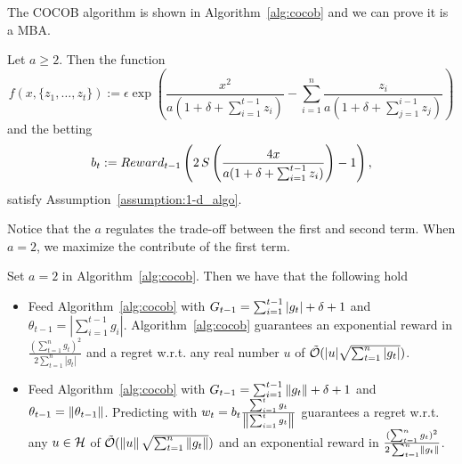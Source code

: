 The \ac{COCOB} algorithm is shown in Algorithm~\ref{alg:cocob} and we can prove it is a \ac{MBA}.
%
\begin{theorem}
\label{theo:cocob}
Let $a\geq2$. Then the function 
\[
f(x,\{z_1, \ldots, z_t\}) := \epsilon \exp\left(\frac{x^2}{a (1+\delta+\sum_{i=1}^{t-1} z_i)} - \sum_{i=1}^{n} \frac{z_i}{a( 1+\delta+\sum_{j=1}^{i-1} z_j) } \right)
\]
and the betting 
\[
b_t:= Reward_{t-1} \left(2 \, S\left(\frac{4 x}{a (1+\delta+\sum_{i=1}^{t-1} z_i)}\right)-1\right),
\]
satisfy Assumption~\ref{assumption:1-d_algo}.
% 
\end{theorem}
%
Notice that the $a$ regulates the trade-off between the first and second term. When $a=2$, we maximize the contribute of the first term.

\begin{cor}
Set $a=2$ in Algorithm~\ref{alg:cocob}. Then we have that the following hold

\begin{itemize}
\item Feed Algorithm~\ref{alg:cocob} with $G_{t-1}=\sum_{i=1}^{t-1} |g_t| + \delta + 1$ and $\theta_{t-1}=|\sum_{i=1}^{t-1} g_i|$.
Algorithm~\ref{alg:cocob} guarantees an exponential reward in $\frac{(\sum_{t=1}^n g_t)^2}{2 \sum_{t=1}^n |g_t|}$ and a regret w.r.t. any real number $u$ of $\tilde{\mathcal{O}}(|u| \sqrt{\sum_{t=1}^n |g_t|})$.

\item Feed Algorithm~\ref{alg:cocob} with $G_{t-1}=\sum_{i=1}^{t-1} \left\|{g_t}\right\| + \delta + 1$ and $\theta_{t-1}=\left\|{\theta_{t-1}}\right\|$.
Predicting with $w_t=b_t \frac{\sum_{i=1}^t g_t}{\left\|{\sum_{i=1}^t g_t}\right\|}$ guarantees a regret w.r.t. any $u \in \mathcal{H}$ of $\tilde{\mathcal{O}}(\left\|{u}\right\| \sqrt{\sum_{t=1}^n \left\|{g_t}\right\|})$ and an exponential reward in $\frac{(\sum_{t=1}^n g_t)^2}{2 \sum_{t=1}^n \left\|{g_t}\right\|}$.

\end{itemize}
\end{cor}